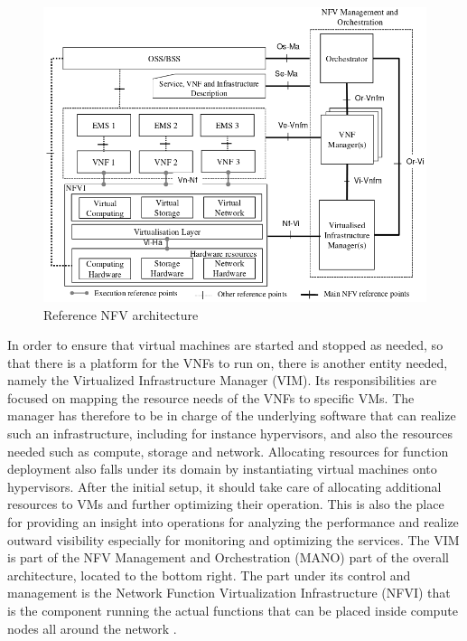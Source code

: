 \begin{figure}[H]
	\centering
	\includegraphics[width=1\linewidth]{images/nfv_ref_arch.png}
	\caption{Reference NFV architecture \cite{etsi1etsi}}
	\label{img:nfv_ref_arch}
\end{figure}

In order to ensure that virtual machines are started and stopped as needed, so that there is a platform for the VNFs to run on, there is another entity needed, namely the Virtualized Infrastructure Manager (VIM). Its responsibilities are focused on mapping the resource needs of the VNFs to specific VMs. The manager has therefore to be in charge of the underlying software that can realize such an infrastructure, including for instance hypervisors, and also the resources needed such as compute, storage and network. Allocating resources for function deployment also falls under its domain by instantiating virtual machines onto hypervisors. After the initial setup, it should take care of allocating additional resources to VMs and further optimizing their operation. This is also the place for providing an insight into operations for analyzing the performance and realize outward visibility especially for monitoring and optimizing the services. 
The VIM is part of the NFV Management and Orchestration (MANO) part of the overall architecture, located to the bottom right. The part under its control and management is the Network Function Virtualization Infrastructure (NFVI) that is the component running the actual functions that can be placed inside compute nodes all around the network \cite{nfv_etsi}. 

